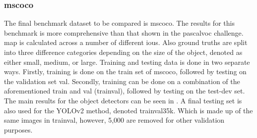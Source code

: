 \subsubsection{\gls{mscoco}}
The final benchmark dataset to be compared is \gls{mscoco}. The results for this benchmark is more comprehensive than that shown in the \gls{pascalvoc} challenge. \gls{map} is calculated across a number of different \glspl{iou}. Also ground truths are split into three difference categories depending on the size of the object, denoted as either small, medium, or large. Training and testing data is done in two separate ways. Firstly, training is done on the train set of \gls{mscoco}, followed by testing on the validation set val. Secondly, training can be done on a combination of the aforementioned train and val (trainval), followed by testing on the test-dev set. The main results for the object detectors can be seen in . A final testing set is also used for the YOLOv2 method, denoted trainval35k. Which is made up of the same images in trainval, however, 5,000 are removed for other validation purposes.

